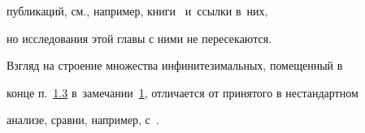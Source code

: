 публикаций, см., например, книги~\cite{bur:1,bur:3, bur:2} и~ссылки в~них,

но исследования этой главы с ними не пересекаются.

Взгляд на строение множества инфинитезимальных, помещенный в

конце п.~\hyperlink{bur.1.3}{1.3} в~замечании~\hyperlink{bur:zam}{1}, отличается от принятого в нестандартном

анализе, сравни, например, с~\cite{bur:14}.












\vspace{-3mm}



